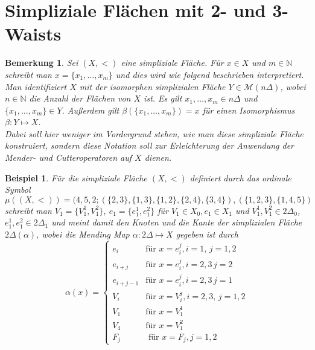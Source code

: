 \documentclass[12pt,titlepage]{article}
\newtheorem{bsp}{Beispiel}[section]
\newtheorem{bemerkung}{Bemerkung}[section]
\begin{document}
\section{Simpliziale Flächen mit 2- und 3-Waists}
\begin{bemerkung}
Sei $(X,<)$ eine simpliziale Fläche.
Für $x\in X$ und $m \in \mathbb{N}$ schreibt man $x=\{x_1,\ldots,x_m\}$ und dies wird wie folgend beschrieben interpretiert.\\ Man identifiziert $X$ mit der isomorphen simplizialen Fläche $Y \in \mathcal{M}(n \Delta)$, wobei $n\in \mathbb{N}$ die Anzahl der Flächen von $X$ ist. Es gilt $x_1,\ldots,x_m \in n\Delta$ und $\{x_1,\ldots,x_m\}\in Y$. Außerdem gilt $\beta(\{x_1,\ldots,x_m\})=x$ für einen  Isomorphismus $\beta: Y \mapsto X$. \\
Dabei soll hier weniger im Vordergrund stehen, wie man diese simpliziale Fläche konstruiert, sondern diese Notation soll zur Erleichterung der Anwendung der Mender- und Cutteroperatoren auf $X$ dienen.
\end{bemerkung}

\begin{bsp}
Für die simpliziale Fläche $(X,<)$ definiert durch das ordinale Symbol 
\[
\mu((X,<))=(4,5,2;(\{2,3\},\{1,3\},\{1,2\},\{2,4\},\{3,4\}),(\{1,2,3\},\{1,4,5\})
\]
schreibt man $V_1=\{V_1^1,V_1^2\}$, $e_1=\{e_1^1,e_1^2\}$ für $V_1\in X_0,e_1 \in X_1$ und $V_1^1,V_1^2 \in 2 \Delta_0$, $e_1^1,e_1^2 \in 2 \Delta_1$ und meint damit den Knoten und die Kante der simplizialen Fläche $2\Delta(\alpha)$, wobei die Mending Map $\alpha:2\Delta \mapsto X$ gegeben ist durch
\[
\alpha(x)= 
\begin{cases}
e_i & \text{für } x =e_i^j ,i=1,\,j=1,2\\
e_{i+j} &\text{für }x=e_i^j ,i=2,3 \,j=2\\
e_{i+j-1} &\text{für }x=e_i^j ,i=2,3 \,j=1\\
V_i &\text{für } x =V_i^j,i=2,3,\,j=1,2\\
V_1 &\text{für }x=V_1^1\\
V_4& \text{für }x=V_1^2\\
F_j & \text{ für } x=F_j, j=1,2
\end{cases}
\]
\end{bsp}
\end{document}
